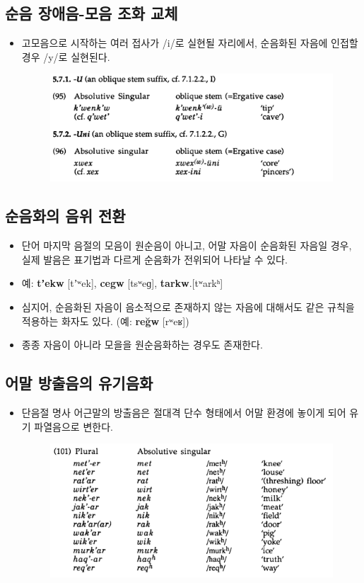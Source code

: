 \subsection{순음 장애음-모음 조화 교체}
\begin{itemize}
\item 고모음으로 시작하는 여러 접사가 /i/로 실현될 자리에서, 순음화된 자음에 인접할 경우 /y/로 실현된다.
\begin{figure}[H]
\centerline{\includegraphics[width=.8\linewidth]{Lezgian/src/ex95.png}}
\end{figure}
\end{itemize}

\subsection{순음화의 음위 전환}
\begin{itemize}
\item 단어 마지막 음절의 모음이 원순음이 아니고, 어말 자음이 순음화된 자음일 경우, 실제 발음은 표기법과 다르게 순음화가 전위되어 나타날 수 있다.
\item 예: \textbf{tʼekw} [tʼʷek], \textbf{cegw} [tsʷeɡ], \textbf{tarkw}.[tʷarkʰ]
\item 심지어, 순음화된 자음이 음소적으로 존재하지 않는 자음에 대해서도 같은 규칙을 적용하는 화자도 있다. (예: \textbf{reğw} [rʷeʁ])
\item 종종 자음이 아니라 모을을 원순음화하는 경우도 존재한다.
\end{itemize}

\subsection{어말 방출음의 유기음화}
\begin{itemize}
\item 단음절 명사 어근말의 방출음은 절대격 단수 형태에서 어말 환경에 놓이게 되어 유기 파열음으로 변한다.
\begin{figure}[H]
\centerline{\includegraphics[width=.8\linewidth]{Lezgian/src/ex101.png}}
\end{figure}
\end{itemize}

